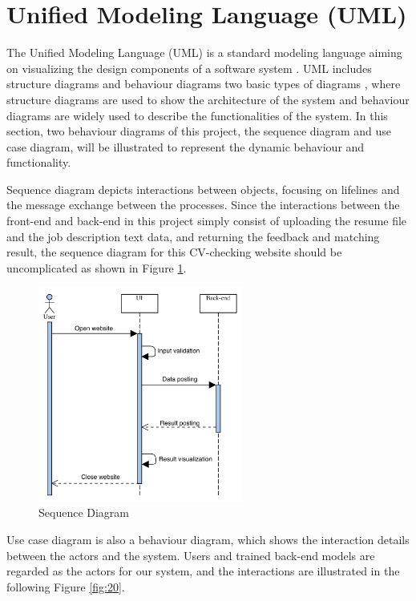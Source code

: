 \section{Unified Modeling Language (UML)}

The Unified Modeling Language (UML) is a standard modeling language aiming on visualizing the design components of a software system \cite{siau2001unified}. UML includes structure diagrams and behaviour diagrams two basic types of diagrams , where structure diagrams are used to show the architecture of the system and behaviour diagrams are widely used to describe the functionalities of the system. In this section, two behaviour diagrams of this project, the sequence diagram and use case diagram, will be illustrated to represent the dynamic behaviour and functionality.

Sequence diagram depicts interactions between objects, focusing on lifelines and the message exchange between the processes. Since the interactions between the front-end and back-end in this project simply consist of uploading the resume file and the job description text data, and returning the feedback and matching result, the sequence diagram for this CV-checking website should be uncomplicated as shown in Figure \ref{fig:19}.


 \begin{figure}[H]
    \centering
    \includegraphics[width=0.6\textwidth]{images/sequence_diagram.png}
    \caption{Sequence Diagram}
    \label{fig:19}
\end{figure}

Use case diagram is also a behaviour diagram, which shows the interaction details between the actors and the system. Users and trained back-end models are regarded as the actors for our system, and the interactions are illustrated in the following Figure \ref{fig:20}.


